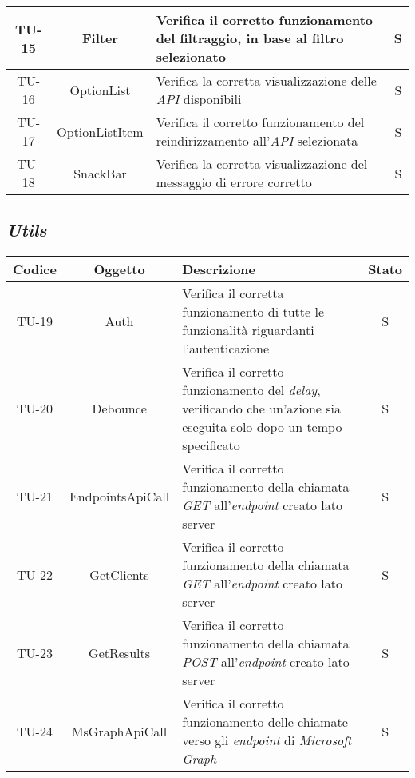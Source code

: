\begin{center}
\begin{longtable}{|c|c|p{}|c|}
  \hline
  TU-15 &Filter &Verifica il corretto funzionamento del filtraggio, in base al filtro selezionato &S \\
  \hline
  TU-16 &OptionList &Verifica la corretta visualizzazione delle \textit{API} disponibili &S \\
  \hline
  TU-17 &OptionListItem &Verifica il corretto funzionamento del reindirizzamento all'\textit{API} selezionata &S \\
  \hline
  TU-18 &SnackBar &Verifica la corretta visualizzazione del messaggio di errore corretto &S \\
  \hline
\end{longtable}
\end{center}

\subsection*{\emph{Utils}}


\begin{center}
  \label{tab:test-unita-utils}
  \begin{longtable}{|c|c|p{}|c|}
  \hline
  \textbf{Codice} & \textbf{Oggetto} & \textbf{Descrizione} & \textbf{Stato}\\
  \hline
  TU-19 &Auth &Verifica il corretta funzionamento di tutte le funzionalità riguardanti l'autenticazione & S \\
  \hline
  TU-20 &Debounce &Verifica il corretto funzionamento del \textit{delay}, verificando che un'azione sia eseguita solo dopo un tempo specificato &S \\
  \hline
  TU-21 &EndpointsApiCall &Verifica il corretto funzionamento della chiamata \textit{GET} all'\textit{endpoint} creato lato server &S \\
  \hline
  TU-22 &GetClients &Verifica il corretto funzionamento della chiamata \textit{GET} all'\textit{endpoint} creato lato server  &S \\
  \hline
  TU-23 &GetResults &Verifica il corretto funzionamento della chiamata \textit{POST} all'\textit{endpoint} creato lato server &S \\
  \hline
  TU-24 &MsGraphApiCall &Verifica il corretto funzionamento delle chiamate verso gli \textit{endpoint} di \textit{Microsoft Graph} &S \\
  \hline
\end{longtable}
\end{center}

